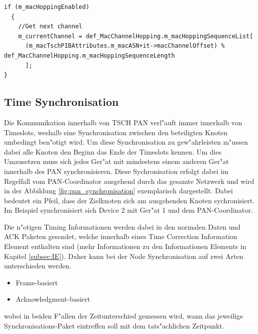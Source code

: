 \begin{lstlisting}[frame=single]
if (m_macHoppingEnabled)
  {
    //Get next channel
    m_currentChannel = def_MacChannelHopping.m_macHoppingSequenceList[
      (m_macTschPIBAttributes.m_macASN+it->macChannelOffset) % def_MacChannelHopping.m_macHoppingSequenceLength
      ];
}
\end{lstlisting}

\subsection{Time Synchronisation}

Die Kommunikation innerhalb von TSCH PAN verl"auft immer innerhalb von Timeslots,
weshalb eine Synchronisation zwischen den beteiligten Knoten umbedingt ben"otigt wird.
Um diese Synchronisation zu gew"ahrleisten m"ussen dabei alle Knoten den Beginn
das Ende der Timeslots kennen. Um dies Umzusetzen muss sich jedes Ger"at mit
mindestens einem anderen Ger"at innerhalb des PAN synchronisieren. Diese
Sychronisation erfolgt dabei im Regelfall vom PAN-Coordinator ausgehend durch das
gesamte Netzwerk und wird in der Abbildung \ref{fig:pan_synchronisation} exemplarisch
dargestellt. Dabei bedeutet ein Pfeil, dass der Zielknoten sich am ausgehenden
Knoten sychronisiert. Im Beispiel synchronisiert sich Device 2 mit Ger"at 1 und
dem PAN-Coordinator.

Die n"otigen Timing Informationen werden dabei in den normalen Daten und ACK
Paketen gesendet, welche innerhalb eines Time Correction Information Element
enthalten sind (mehr Informationen zu den Informationen Elements in Kapitel \ref{subsec:IE}).
Daher kann bei der Node Synchronisation auf zwei Arten unterschieden werden.

\begin{itemize}
  \item Frame-basiert
  \item Acknowledgment-basiert
\end{itemize}

wobei in beiden F"allen der Zeitunterschied gemessen wird, wann das jeweilige
Synchronisations-Paket eintreffen soll mit dem tats"achlichen Zeitpunkt.

